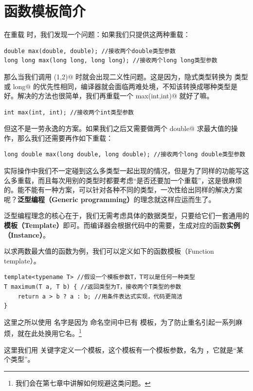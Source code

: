 \section{函数模板简介}
在重载 \lstinline@max@ 时，我们发现一个问题：如果我们只提供这两种重载：
\begin{lstlisting}
double max(double, double); //接收两个double类型参数
long long max(long long, long long); //接收两个long long类型参数
\end{lstlisting}
那么当我们调用 \lstinline@max(1,2)@ 时就会出现二义性问题。这是因为，\lstinline@int@ 隐式类型转换为 \lstinline@double@ 类型或 \lstinline@long long@ 的优先性相同，编译器就会面临两难处境，不知该转换成哪种类型是好。解决的方法也很简单，我们再重载一个 \lstinline@int max(int,int)@ 就好了嘛。
\begin{lstlisting}
int max(int, int); //接收两个int类型参数
\end{lstlisting}\par
但这不是一劳永逸的方案。如果我们之后又需要做两个 \lstinline@long double@ 求最大值的操作，那么我们还需要再作如下重载：
\begin{lstlisting}
long double max(long double, long double); //接收两个long double类型参数
\end{lstlisting}\par
实际操作中我们不一定碰到这么多类型一起出现的情况，但是为了同样的功能写这么多重载，而且每次用别的类型时都要考虑``是否还要加一个重载''，这是很麻烦的。能不能有一种方案，可以针对各种不同的类型，一次性给出同样的解决方案呢？\textbf{泛型编程（Generic programming）}的理念就这样应运而生了。\par
泛型编程理念的核心在于，我们无需考虑具体的数据类型，只要给它们一套通用的\textbf{模板（Template）}即可。而编译器会根据代码中的需要，生成对应的函数\textbf{实例（Instance）}。\par
以求两数最大值的函数为例，我们可以定义如下的函数模板（Function template）。
\begin{lstlisting}
template<typename T> //假设一个模板参数T，T可以是任何一种类型
T maximum(T a, T b) { //返回类型为T，接收两个T类型的参数
    return a > b ? a : b; //用条件表达式实现，代码更简洁
}
\end{lstlisting}
这里之所以使用 \lstinline@maxinum@ 名字是因为 \lstinline@std@ 命名空间中已有 \lstinline@max@ 模板，为了防止重名引起一系列麻烦，就在此处换用它名。\footnote{我们会在第七章中讲解如何规避这类问题。}\par
这里我们用 \lstinline@template@ 关键字定义一个模板，这个模板有一个模板参数，名为 \lstinline@T@，它就是``某个类型''。\par
